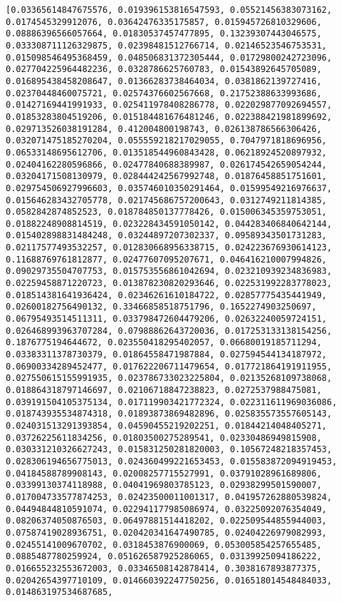 \documentclass{article}
\begin{document}
    \begin{Verbatim}[commandchars=\\\{\}]
[0.03365614847675576, 0.019396153816547593, 0.05521456383073162, 0.0174545329912076, 0.03642476335175857, 0.015945726810329606, 0.08886396566057664, 0.01830537457477895, 0.13239307443046575, 0.033308711126329875, 0.02398481512766714, 0.02146523546753531, 0.015098546495368459, 0.048506831372305444, 0.01729800242723096, 0.027704225964482236, 0.0328786625760783, 0.01543892645705089, 0.016895438458208647, 0.01366283738464034, 0.0381862139727416, 0.02370448460075721, 0.02574376602567668, 0.21752388633993686, 0.01427169441991933, 0.025411978408286778, 0.022029877092694557, 0.01853283804519206, 0.015184481676481246, 0.022388421981899692, 0.029713526038191284, 0.412004800198743, 0.026138786566306426, 0.032071475185270204, 0.055559218217029055, 0.7047971818696956, 0.06533148695612706, 0.013518544960843428, 0.06218924520897932, 0.02404162280596866, 0.02477840688389987, 0.026174542659054244, 0.03204171508130979, 0.028444242567992748, 0.01876458851751601, 0.029754506927996603, 0.035746010350291464, 0.01599549216976637, 0.015646283432705778, 0.021745686757200643, 0.0312749211814385, 0.0582842874852523, 0.018784850137778426, 0.015006345359753051, 0.01882248908814519, 0.023228434591050142, 0.044283406840642144, 0.015402898831484248, 0.03244897207302337, 0.09589343501731283, 0.02117577493532257, 0.012830668956338715, 0.024223676930614123, 0.11688769761812877, 0.02477607095207671, 0.046416210007994826, 0.09029735504707753, 0.015753556861042694, 0.023210939234836983, 0.02259458871220723, 0.013878230820293646, 0.022531992283778023, 0.018514381641936424, 0.02346261610184722, 0.02857775435441949, 0.02600182756490132, 0.33466858518751796, 0.1652274903250697, 0.06795493514511311, 0.033798472604479206, 0.02632240059724151, 0.026468993963707284, 0.07988862643720036, 0.017253133138154256, 0.1876775194644672, 0.023550418295402057, 0.06680019185711294, 0.03383311378730379, 0.01864558471987884, 0.027594544134187972, 0.06900334289452477, 0.017622206711479654, 0.017721864191911955, 0.027550615155991935, 0.023786733023225804, 0.02135268109738068, 0.018864318797146697, 0.02106718847238823, 0.0272537988475081, 0.039191504105375134, 0.017119903421772324, 0.022311611969036086, 0.018743935534874318, 0.01893873869482896, 0.025835573557605143, 0.024031513291393854, 0.04590455219202251, 0.01844214048405271, 0.03726225611834256, 0.01803500275289541, 0.02330486949815908, 0.030331210326627243, 0.015831250281820003, 0.10567248218357453, 0.028306194656775013, 0.024360499221653453, 0.015583872094919453, 0.04184588789908143, 0.02008257715527991, 0.03791028961689806, 0.03399130374118988, 0.04041969803785123, 0.02938299501590007, 0.017004733577874253, 0.02423500011001317, 0.041957262880539824, 0.04494844810591074, 0.022941177985086974, 0.03225092076354049, 0.08206374050876503, 0.06497881514418202, 0.022509544855944003, 0.07587419028936751, 0.020420341647490785, 0.02404226979082993, 0.02455141009670702, 0.0318453876900069, 0.053005854257655485, 0.0885487780259924, 0.051626587925286065, 0.03139925094186222, 0.016655232553672003, 0.03346508142878414, 0.3038167893877375, 0.02042654397710109, 0.014660392247750256, 0.016518014548484033, 0.014863197534687685, 
\end{Verbatim}
\end{document}
